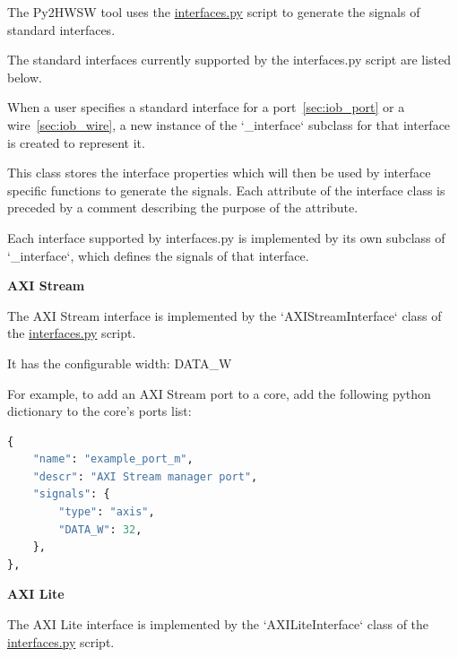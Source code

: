 %

%
%

The Py2HWSW tool uses the \href{https://github.com/IObundle/py2hwsw/blob/main/py2hwsw/scripts/interfaces.py}{interfaces.py} script to generate the signals of standard interfaces.

The standard interfaces currently supported by the interfaces.py script are listed below.


When a user specifies a standard interface for a port~\ref{sec:iob_port} or a wire~\ref{sec:iob_wire}, a new instance of the `\_interface` subclass for that interface is created to represent it.


This class stores the interface properties which will then be used by interface specific functions to generate the signals.
Each attribute of the interface class is preceded by a comment describing the purpose of the attribute.

Each interface supported by interfaces.py is implemented by its own subclass of `\_interface`, which defines the signals of that interface.

%
%
\clearpage
\large\textbf{AXI Stream}

The AXI Stream interface is implemented by the `AXIStreamInterface` class of the \href{https://github.com/IObundle/py2hwsw/blob/main/py2hwsw/scripts/interfaces.py}{interfaces.py} script.


It has the configurable width: DATA\_W

For example, to add an AXI Stream port to a core, add the following python dictionary to the core's ports list:
\begin{lstlisting}[language=python]
{
	"name": "example_port_m",
	"descr": "AXI Stream manager port",
	"signals": {
		"type": "axis",
		"DATA_W": 32,
	},
},
\end{lstlisting}


%
%
\clearpage
\large\textbf{AXI Lite}

The AXI Lite interface is implemented by the `AXILiteInterface` class of the \href{https://github.com/IObundle/py2hwsw/blob/main/py2hwsw/scripts/interfaces.py}{interfaces.py} script.


